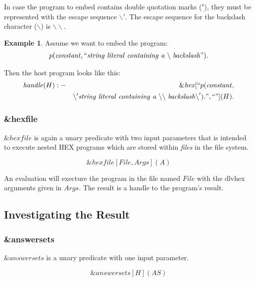 \documentclass[a4paper,11pt]{article}
\theoremstyle{definition}
\newtheorem{example}{Example}
\newenvironment{mathprogram}[1][P]
	{
		\renewcommand{\ruleimplication}{&:-&}
		\newcommand{\ruledelimiter}{1}
		\begin{eqnarray*}
	}
	{
		\end{eqnarray*}
	}
\newcommand{\ruleimplication}{\ensuremath{\mathit{:-}}}
\newcommand{\hex}{\textsf{HEX}\xspace }
\newcommand{\dlvhex}{\textsf{dlvhex}\xspace }
\begin{document}
				In case the program to embed contains double quotation marks ("), they must be represented with the escape sequence $\backslash'$. The escape sequence for the backslash
				character ($\backslash$) is $\backslash\backslash$.
				
				\begin{example}
					\label{ex:Calling2}
	Assume we want to embed the program:
					\begin{mathprogram}
p(\mathit{constant}, \mathit{``string\ literal\ containing\ a\ \backslash\ backslash"}).
					\end{mathprogram}

	Then the host program looks like this:
					\begin{mathprogram}
\mathit{handle}(H) \ruleimplication \mathit{\&hex}[``p(\mathit{constant}, \\
					&&				\backslash'\mathit{string\ literal\ containing\ a\ \backslash\backslash\ backslash\backslash}').", ``"](H).
					\end{mathprogram}
				\end{example}

				
			\subsubsection{\&hexfile}

				$\mathit{\&hexfile}$ is again a unary predicate with two input parameters that is intended to execute nested \hex programs which are stored within \emph{files} in the file system.
			
					$$\mathit{\&hexfile}[\mathit{File}, \mathit{Args}](A)$$
				
				An evaluation will execture the program in the file named $\mathit{File}$ with the \dlvhex arguments given in $\mathit{Args}$. The result is a handle to the program's result.


		\subsection{Investigating the Result}
		\label{sec:ExternalAtoms:Investigation}

		
			\subsubsection{\&answersets}

				$\mathit{\&answersets}$ is a unary predicate with one input parameter.
				
					$$\mathit{\&answersets}[H](\mathit{AS})$$
				
\end{document}
